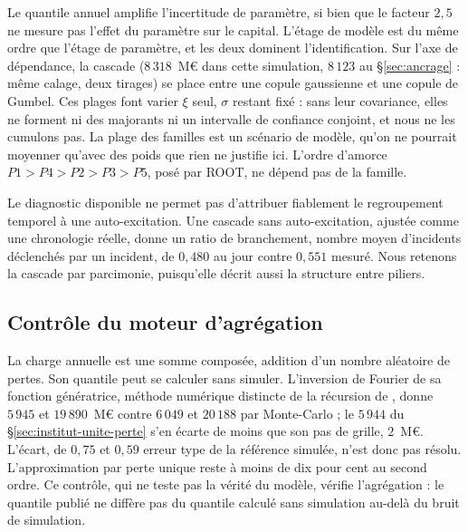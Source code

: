 \vspace{4pt}
\noindent Le quantile annuel amplifie l'incertitude de paramètre, si bien que le facteur
$2{,}5$ ne mesure pas l'effet du paramètre sur le capital. L'étage de modèle est du même ordre que
l'étage de paramètre, et les deux dominent l'identification. Sur l'axe de dépendance, la cascade
($8\,318$~M\euro{} dans cette simulation, $8\,123$ au \S\ref{sec:ancrage} : même calage, deux tirages) se place entre une copule gaussienne et une copule de Gumbel. Ces plages font varier $\xi$ seul, $\sigma$ restant fixé : sans leur covariance, elles ne forment ni des majorants ni un intervalle de confiance conjoint, et nous ne les cumulons pas. La plage des familles est un scénario de modèle, qu'on ne pourrait moyenner qu'avec des poids que rien ne justifie ici. L'ordre d'amorce $P1>P4>P2>P3>P5$, posé par ROOT, ne dépend pas de la famille.

Le diagnostic disponible ne permet pas d'attribuer fiablement le regroupement temporel à une auto-excitation. Une
cascade sans auto-excitation, ajustée comme une chronologie réelle, donne un ratio de branchement,
nombre moyen d'incidents déclenchés par un incident, de $0{,}480$ au jour contre $0{,}551$ mesuré. Nous retenons la cascade par parcimonie, puisqu'elle
décrit aussi la structure entre piliers.

\subsection{Contrôle du moteur d'agrégation}
\label{sec:triangulation-agregation}

La charge annuelle est une somme composée, addition d'un nombre aléatoire de pertes. Son quantile peut se calculer sans
simuler. L'inversion de Fourier de sa fonction génératrice, méthode numérique distincte de la récursion de \citet{panjer1981}, donne $5\,945$ et $19\,890$~M\euro{} contre $6\,049$ et $20\,188$ par Monte-Carlo ; le $5\,944$ du \S\ref{sec:institut-unite-perte} s'en écarte de moins que son pas de grille, $2$~M\euro.
L'écart, de $0{,}75$ et $0{,}59$ erreur type de la référence simulée, n'est donc pas résolu. L'approximation par perte unique \citep{bockerkluppelberg2005} reste à moins de dix pour cent
au second ordre. Ce contrôle, qui ne teste pas la vérité du modèle, vérifie l'agrégation : le quantile publié ne
diffère pas du quantile calculé sans simulation au-delà du bruit de simulation.


